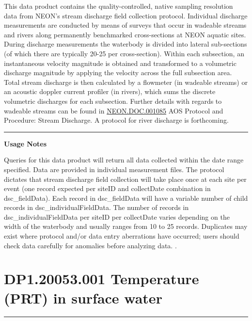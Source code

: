 \documentclass[]{article}
\begin{document}
This data product contains the quality-controlled, native sampling
resolution data from NEON's stream discharge field collection protocol.
Individual discharge measurements are conducted by means of surveys that
occur in wadeable streams and rivers along permanently benchmarked
cross-sections at NEON aquatic sites. During discharge measurements the
waterbody is divided into lateral sub-sections (of which there are
typically 20-25 per cross-section). Within each subsection, an
instantaneous velocity magnitude is obtained and transformed to a
volumetric discharge magnitude by applying the velocity across the full
subsection area. Total stream discharge is then calculated by a
flowmeter (in wadeable streams) or an acoustic doppler current profiler
(in rivers), which sums the discrete volumetric discharges for each
subsection. Further details with regards to wadeable streams can be
found in
\href{data.neonscience.org/api/v0/documents/NEON.DOC.001085vD}{NEON.DOC.001085}
AOS Protocol and Procedure: Stream Discharge. A protocol for river
discharge is forthcoming.

\begin{center}\rule{0.5\linewidth}{\linethickness}\end{center}

\textbf{Usage Notes}

Queries for this data product will return all data collected within the
date range specified. Data are provided in individual measurement files.
The protocol dictates that stream discharge field collection will take
place once at each site per event (one record expected per siteID and
collectDate combination in dsc\_fieldData). Each record in
dsc\_fieldData will have a variable number of child records in
dsc\_individualFieldData. The number of records in
dsc\_individualFieldData per siteID per collectDate varies depending on
the width of the waterbody and usually ranges from 10 to 25 records.
Duplicates may exist where protocol and/or data entry aberrations have
occurred; users should check data carefully for anomalies before
analyzing data. \newpage
.

\section{DP1.20053.001 Temperature (PRT) in surface
water}\label{dp1.20053.001-temperature-prt-in-surface-water}

\begin{center}\rule{0.5\linewidth}{\linethickness}\end{center}
\end{document}
